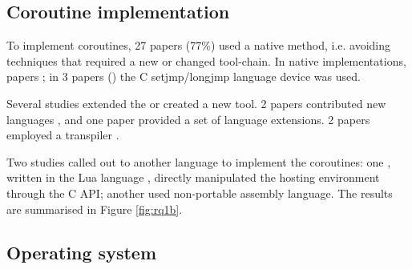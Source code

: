 \DIFaddend \subsection{Coroutine implementation}

To implement coroutines, 27 papers (77\%) used a native method, i.e. avoiding techniques that required a new or changed tool-chain. In native implementations, \DIFdelbegin {} papers \DIFdelbegin {}\DIFdelend \DIFaddbegin {} \DIFdelbegin {}\DIFdelend \DIFaddbegin {}\DIFaddend ; in 3 papers (\cite{Yu2008, Cohen2007b, Kalebe2017}) the C setjmp/longjmp language device was used.

Several studies extended the \DIFdelbegin {}\DIFdelend \DIFaddbegin {}\DIFaddend or created a new tool. 2 papers contributed new languages \cite{Jahier2016, Evers2007}, and one paper \cite{Niebert2014} provided a set of language extensions. 2 papers \DIFdelbegin {}\DIFdelend employed a transpiler \DIFdelbegin {}\DIFdelend \DIFaddbegin {}\DIFaddend .

Two studies called out to another language to implement the coroutines: one \cite{Park2015}, written in the Lua language \cite{Moura2004a}, directly manipulated the hosting environment through the C API; another \cite{Khezri2008} used non-portable assembly language. The results are summarised in Figure \ref{fig:rq1b}.

\subsection{Operating system}

